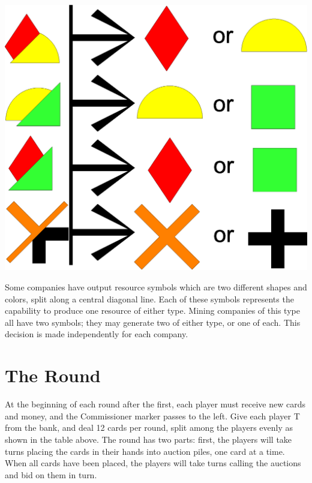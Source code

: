 \documentclass[]{article}
\newcommand{\tyen}{T\textyen}
\begin{document}
\begin{minipage}{.3\textwidth}
\includegraphics[scale=0.2]{hybrids}
\end{minipage}
\begin{minipage}{.7\textwidth}
Some companies have output resource symbols which are two different shapes and colors, split along a central diagonal line. Each of these symbols represents the capability to produce one resource of either type. Mining companies of this type all have two symbols; they may generate two of either type, or one of each. This decision is made independently for each company.
\end{minipage}



\pagebreak
\section*{The Round}

At the beginning of each round after the first, each player must receive new cards and money, and the Commissioner marker passes to the left. Give each player \tyen 10 from the bank, and deal 12 cards per round, split among the players evenly as shown in the table above. The round has two parts: first, the players will take turns placing the cards in their hands into auction piles, one card at a time. When all cards have been placed, the players will take turns calling the auctions and bid on them in turn.
\end{document}
